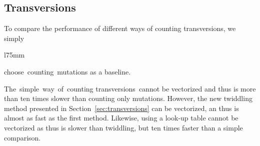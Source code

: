 \documentclass[10pt,letterpaper]{article}
\begin{document}
\newpage
\subsection{Transversions}

{
To compare the performance of different ways of counting transversions, we simply


\begin{wrapfigure}{l}{75mm}
    \captionsetup{labelformat=empty}
    \caption{}
    \label{fig:transversions}
\end{wrapfigure}
\noindent choose~counting~mutations as a baseline.

The~simple~way~of~counting transversions~cannot be vectorized and thus is more than ten times slower than counting only mutations. However, the new twiddling method presented in Section~\ref{sec:transversions} can be vectorized, an thus is almost as fast as the first method. Likewise, using a look-up table cannot be vectorized as thus is slower than twiddling, but ten times faster than a simple comparison.


}


\vspace*{3cm}

\nolinenumbers




\end{document}
